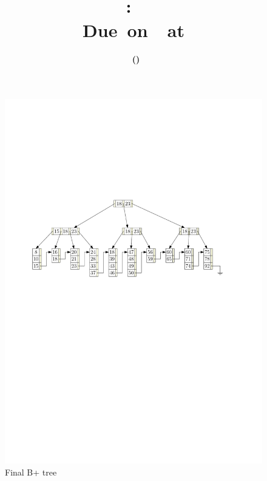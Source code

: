 \documentclass[11pt,letterpaper,titlepage,en-US]{article}
\title{
    \vspace{2in}
    \textmd{\textbf{\hmwkClassName \\\hmwkClass:\ \hmwkTitle}}\\
    \normalsize\vspace{0.1in}\small{Due\ on\ \DTMusedate{DueDate}\ at \DTMusetime{DueDate} }\\
    \vspace{0.1in}\large{\textit{\hmwkClassInstructor}}
    \vspace{3in}
}
\author{\textbf{\hmwkAuthorName\ \footnotesize{(\hmwkAuthorNetID)}} \\ \hmwkAuthorUTDEmail}
\date{}
\begin{document}
\maketitle


\pagebreak



\begin{homeworkProblem}
\begin{figure}[H]
    \caption{Final B+ tree}\label{4}
    \centering
    \includegraphics[width=\textwidth]{2}
\end{figure}
\end{homeworkProblem}


\end{document}
